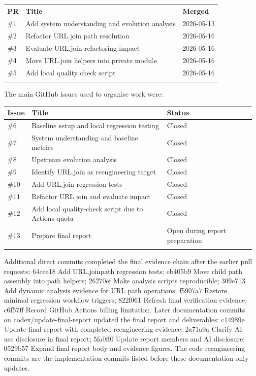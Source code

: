 \documentclass[11pt,a4paper]{article}
\begin{document}
\begin{longtable}{p{} p{} p{}}
\toprule
PR & Title & Merged \\
\midrule
\#1 & Add system understanding and evolution analysis & 2026-05-13 \\
\addlinespace
\#2 & Refactor URL.join path resolution & 2026-05-16 \\
\addlinespace
\#3 & Evaluate URL.join refactoring impact & 2026-05-16 \\
\addlinespace
\#4 & Move URL.join helpers into private module & 2026-05-16 \\
\addlinespace
\#5 & Add local quality check script & 2026-05-16 \\
\addlinespace
\bottomrule
\end{longtable}


The main GitHub issues used to organise work were:


\begin{longtable}{p{} p{} p{}}
\toprule
Issue & Title & Status \\
\midrule
\#6 & Baseline setup and local regression testing & Closed \\
\addlinespace
\#7 & System understanding and baseline metrics & Closed \\
\addlinespace
\#8 & Upstream evolution analysis & Closed \\
\addlinespace
\#9 & Identify URL.join as reengineering target & Closed \\
\addlinespace
\#10 & Add URL.join regression tests & Closed \\
\addlinespace
\#11 & Refactor URL.join and evaluate impact & Closed \\
\addlinespace
\#12 & Add local quality-check script due to Actions quota & Closed \\
\addlinespace
\#13 & Prepare final report & Open during report preparation \\
\addlinespace
\bottomrule
\end{longtable}


Additional direct commits completed the final evidence chain after the earlier pull requests: 64cee18 Add URL.joinpath regression tests; eb405b9 Move child path assembly into path helpers; 26270ef Make analysis scripts reproducible; 309e713 Add dynamic analysis evidence for URL path operations; f5907a7 Restore minimal regression workflow triggers; 822f061 Refresh final verification evidence; c6f57ff Record GitHub Actions billing limitation. Later documentation commits on codex/update-final-report updated the final report and deliverables: c14989e Update final report with completed reengineering evidence; 2a71a9a Clarify AI use disclosure in final report; 5fa0ff0 Update report members and AI disclosure; 0529b57 Expand final report body and evidence figures. The code reengineering commits are the implementation commits listed before these documentation-only updates.
\end{document}
